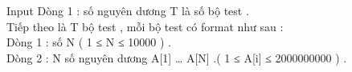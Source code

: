 Input
Dòng 1 : số nguyên dương T là số bộ test .   
\\   Tiếp theo là T bộ test , mỗi bộ test có format như sau :   
\\   Dòng 1 : số N ( 1 ≤ N ≤ 10000 ) .   
\\   Dòng 2 : N số nguyên dương A[1] … A[N] .( 1 ≤ A[i] ≤ 2000000000 ) .   
\\